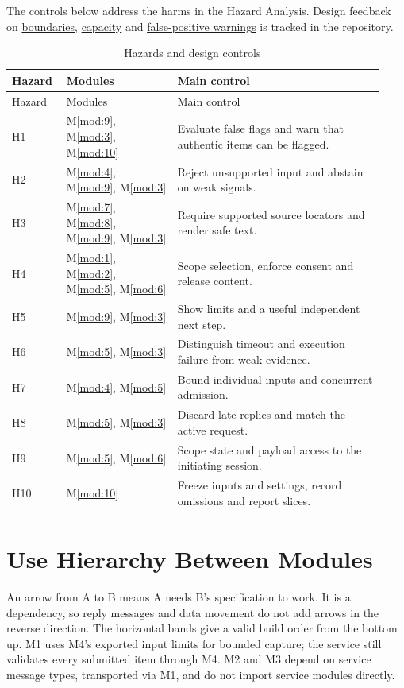 \documentclass[12pt, titlepage]{article}
\newcommand{\repo}{https://github.com/richy1337/Verity}
\newcommand{\mref}[1]{M\ref{#1}}
\newcommand{\modref}[1]{\mref{mod:#1}}
\begin{document}
\noindent The controls below address the harms in the Hazard Analysis. Design feedback on
\href{\repo/issues/57}{boundaries}, \href{\repo/issues/64}{capacity} and
\href{\repo/issues/65}{false-positive warnings} is tracked in the repository.

\begin{longtable}{@{}p{0.12\linewidth}p{0.29\linewidth}p{0.52\linewidth}@{}}
\caption{Hazards and design controls}\label{TblHazards}\\
\toprule Hazard & Modules & Main control \\ \midrule
\endfirsthead
\toprule Hazard & Modules & Main control \\ \midrule
\endhead
H1 & \modref{9}, \modref{3}, \modref{10} & Evaluate false flags and warn that authentic items can be flagged. \\
H2 & \modref{4}, \modref{9}, \modref{3} & Reject unsupported input and abstain on weak signals. \\
H3 & \modref{7}, \modref{8}, \modref{9}, \modref{3} & Require supported source locators and render safe text. \\
H4 & \modref{1}, \modref{2}, \modref{5}, \modref{6} & Scope selection, enforce consent and release content. \\
H5 & \modref{9}, \modref{3} & Show limits and a useful independent next step. \\
H6 & \modref{5}, \modref{3} & Distinguish timeout and execution failure from weak evidence. \\
H7 & \modref{4}, \modref{5} & Bound individual inputs and concurrent admission. \\
H8 & \modref{5}, \modref{3} & Discard late replies and match the active request. \\
H9 & \modref{5}, \modref{6} & Scope state and payload access to the initiating session. \\
H10 & \modref{10} & Freeze inputs and settings, record omissions and report slices. \\
\bottomrule
\end{longtable}

\section{Use Hierarchy Between Modules} \label{SecUse}

An arrow from A to B means A needs B's specification to work. It is a dependency, so reply messages and data movement do not add arrows in the reverse direction. The horizontal bands give a valid build order from the bottom up. M1 uses M4's exported input limits for bounded capture; the service still validates every submitted item through M4. M2 and M3 depend on service message types, transported via M1, and do not import service modules directly.
\end{document}
